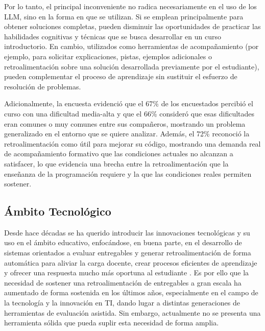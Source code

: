 \documentclass[letterpaper, 10 pt, conference]{ieeeconf}
\begin{document}
Por lo tanto, el principal inconveniente no radica necesariamente en el uso de los LLM, sino en la forma en que se utilizan. Si se emplean principalmente para obtener soluciones completas, pueden disminuir las oportunidades de practicar las habilidades cognitivas y técnicas que se busca desarrollar en un curso introductorio. En cambio, utilizados como herramientas de acompañamiento (por ejemplo, para solicitar explicaciones, pistas, ejemplos adicionales o retroalimentación sobre una solución desarrollada previamente por el estudiante), pueden complementar el proceso de aprendizaje sin sustituir el esfuerzo de resolución de problemas.

Adicionalmente, la encuesta evidenció que el 67\% de los encuestados percibió el curso con una dificultad media-alta y que el 66\% consideró que esas dificultades eran comunes o muy comunes entre sus compañeros, mostrando un problema generalizado en el entorno que se quiere analizar. Además, el 72\% reconoció la retroalimentación como útil para mejorar su código, mostrando una demanda real de acompañamiento formativo que las condiciones actuales no alcanzan a satisfacer, lo que evidencia una brecha entre la retroalimentación que la enseñanza de la programación requiere y la que las condiciones reales permiten sostener.


\subsection{Ámbito Tecnológico}  

Desde hace décadas se ha querido introducir las innovaciones tecnológicas y su uso en el ámbito educativo, enfocándose, en buena parte, en el desarrollo de sistemas orientados a evaluar entregables y generar retroalimentación de forma automática para aliviar la carga docente, crear procesos eficientes de aprendizaje y ofrecer una respuesta mucho más oportuna al estudiante \cite{9}. Es por ello que la necesidad de sostener una retroalimentación de entregables a gran escala ha aumentado de forma sostenida en los últimos años, especialmente en el campo de la tecnología y la innovación en TI, dando lugar a distintas generaciones de herramientas de evaluación asistida. Sin embargo, actualmente no se presenta una herramienta sólida que pueda suplir esta necesidad de forma amplia. 
\end{document}
